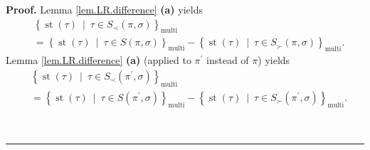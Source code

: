 \documentclass[numbers=enddot,12pt,final,onecolumn,notitlepage]{scrartcl}%
\theoremstyle{definition}
\newenvironment{proof}[1][Proof]{\noindent\textbf{#1.} }{\ \rule{0.5em}{0.5em}}
\begin{document}
\begin{proof}
Lemma \ref{lem.LR.difference} \textbf{(a)} yields%
\begin{align}
&  \left\{  \operatorname*{st}\left(  \tau\right)  \ \mid\ \tau\in S_{\prec
}\left(  \pi,\sigma\right)  \right\}  _{\operatorname*{multi}}\nonumber\\
&  =\left\{  \operatorname*{st}\left(  \tau\right)  \ \mid\ \tau\in S\left(
\pi,\sigma\right)  \right\}  _{\operatorname*{multi}}-\left\{
\operatorname*{st}\left(  \tau\right)  \ \mid\ \tau\in S_{\succ}\left(
\pi,\sigma\right)  \right\}  _{\operatorname*{multi}}.
\label{pf.thm.head-comp.LRcomp.c1.pf.7}%
\end{align}
Lemma \ref{lem.LR.difference} \textbf{(a)} (applied to $\pi^{\prime}$ instead
of $\pi$) yields%
\begin{align}
&  \left\{  \operatorname*{st}\left(  \tau\right)  \ \mid\ \tau\in S_{\prec
}\left(  \pi^{\prime},\sigma\right)  \right\}  _{\operatorname*{multi}%
}\nonumber\\
&  =\left\{  \operatorname*{st}\left(  \tau\right)  \ \mid\ \tau\in S\left(
\pi^{\prime},\sigma\right)  \right\}  _{\operatorname*{multi}}-\left\{
\operatorname*{st}\left(  \tau\right)  \ \mid\ \tau\in S_{\succ}\left(
\pi^{\prime},\sigma\right)  \right\}  _{\operatorname*{multi}}.
\label{pf.thm.head-comp.LRcomp.c1.pf.8}%
\end{align}



\end{proof}
\end{document}
